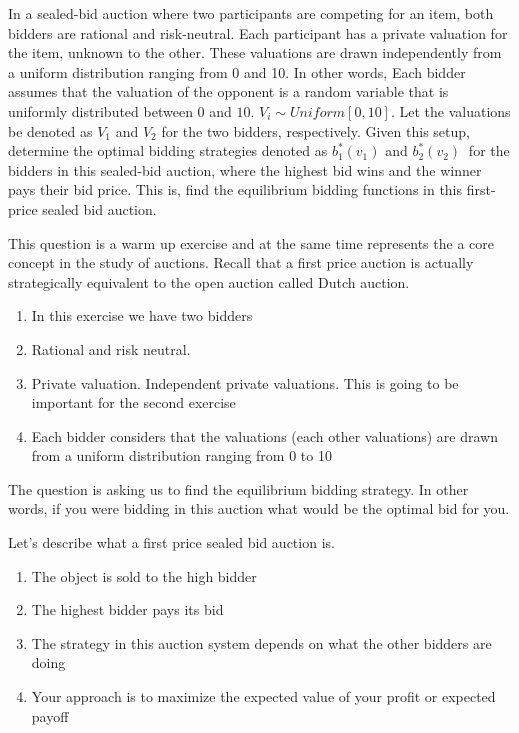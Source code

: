 \documentclass[11pt]{article} %
\begin{document}
In a sealed-bid auction where two participants are competing for an item, both bidders are rational and risk-neutral. Each participant has a private valuation for the item, unknown to the other. These valuations are drawn independently from a uniform distribution ranging from 0 and 10. In other words, Each bidder assumes that the valuation of the opponent is a random variable that is uniformly distributed between $0$ and $10$. $V_i \sim Uniform\left[0,10\right]$. Let the valuations be denoted as $V_1$ and $V_2$ for the two bidders, respectively.
Given this setup, determine the optimal bidding strategies denoted as $b_1^\ast\left(v_1\right)$ and $b_2^\ast\left(v_2\right)\ $  for the bidders in this sealed-bid auction, where the highest bid wins and the winner pays their bid price. This is, find the equilibrium bidding functions in this first-price sealed bid auction.


This question is a warm up exercise and at the same time represents the a core concept in the study of auctions. Recall that a first price auction is actually strategically equivalent to the open auction called Dutch auction. 


\begin{enumerate}
	\item In this exercise we have two bidders
	\item Rational and risk neutral.
	\item Private valuation. Independent private valuations. This is going to be important for the second exercise
	\item Each bidder considers that the valuations (each other valuations) are drawn from a uniform distribution ranging from 0 to 10
\end{enumerate}

The question is asking us to find the equilibrium bidding strategy. In other words, if you were bidding in this auction what would be the optimal bid for you. 

Let's describe what a first price sealed bid auction is. 

\begin{enumerate}
	\item The object is sold to the high bidder
	\item The highest bidder pays its bid
	\item The strategy in this auction system depends on what the other bidders are doing
	\item Your approach is to maximize the expected value of your profit or expected payoff
\end{enumerate}
\end{document}
